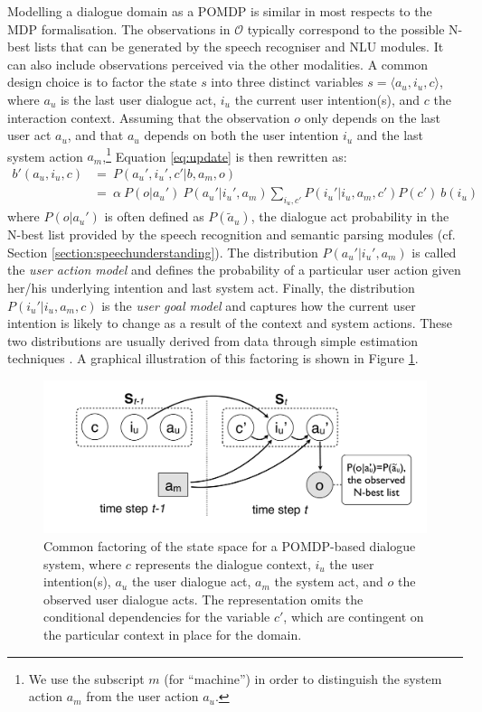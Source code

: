 Modelling a dialogue domain as a POMDP is similar in most respects to the MDP formalisation.  The observations in $\mathcal{O}$ typically correspond to the possible N-best lists that can be generated by the speech recogniser and NLU modules.  It can also include observations perceived via the other modalities. A common design choice is to factor the state $s$ into three distinct variables $s = \langle a_u, i_u, c \rangle$, where $a_u$ is the last user dialogue act, $i_u$ the current user intention(s), and $c$ the interaction context.   Assuming that the observation $o$ only depends on the last user act $a_u$, and that $a_u$ depends on both the user intention $i_u$ and the last system action $a_m$,\footnote{We use the subscript $m$ (for ``machine'') in order to distinguish the system action $a_m$ from the user action $a_u$.}  Equation \ref{eq:update} is then rewritten as:
\begin{align}
b'(a_u, i_u, c) & = \ P(a_u', i_u', c'|b, a_m,o)\\
& = \ \alpha \ P(o|a_u') \ P(a_u'|i_u', a_m) \sum_{i_u, c'} P(i_u'|i_u,a_m, c') P(c') \ b(i_u)
\end{align}
where $P(o|a_u')$ is often defined as $P(\tilde{a}_u)$, the dialogue act probability in the N-best list provided by the speech recognition and semantic parsing modules (cf. Section \ref{section:speechunderstanding}).    The distribution $P(a_u'|i_u', a_m)$ is called the \textit{user action model} and defines the probability of a particular user action given her/his underlying intention and last system act.  Finally, the distribution $P(i_u'|i_u, a_m, c)$ is the \textit{user goal model} and captures how the current user intention is likely to change as a result of the context and system actions.  These two distributions are usually derived from data through simple estimation techniques \citep{Young:2010}. A graphical illustration of this factoring is shown in Figure \ref{fig:pomdp2}. 

\begin{figure}[h]
\centering
\includegraphics[scale=0.25]{imgs/POMDP2.pdf}
\caption{Common factoring of the state space for a POMDP-based dialogue system, where $c$ represents the dialogue context, $i_u$ the user intention(s), $a_u$ the user dialogue act, $a_m$ the system act, and $o$ the observed user dialogue acts. The representation omits the conditional dependencies for the variable $c'$, which are contingent on the particular context in place for the domain.}
\label{fig:pomdp2}
\end{figure}

